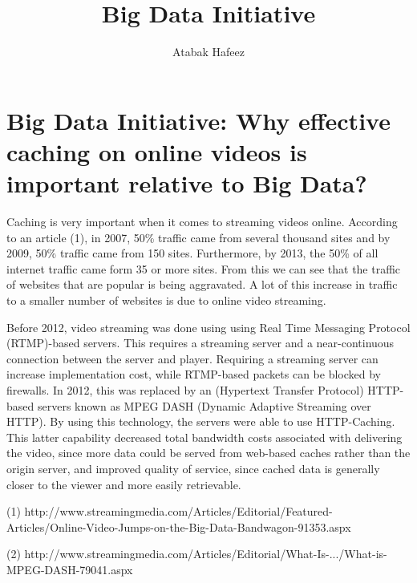 \documentclass[11pt, oneside]{article}   	%
\title{Big Data Initiative}
\author{Atabak Hafeez}
\begin{document}
\maketitle
\section{Big Data Initiative: Why effective caching on online videos is important relative to Big Data?}

Caching is very important when it comes to streaming videos online. According to an article (1), in 2007, 50\% traffic came from several thousand sites and by 2009, 50\% traffic came from 150 sites. Furthermore, by 2013, the 50\% of all internet traffic came form 35 or more sites. From this we can see that the traffic of websites that are popular is being aggravated. A lot of this increase in traffic to a smaller number of websites is due to online video streaming.

Before 2012, video streaming was done using using Real Time Messaging Protocol (RTMP)-based servers. This requires a streaming server and a near-continuous connection between the server and player. Requiring a streaming server can increase implementation cost, while RTMP-based packets can be blocked by firewalls. In 2012, this was replaced by an (Hypertext Transfer Protocol) HTTP-based servers known as MPEG DASH (Dynamic Adaptive Streaming over HTTP).  By using this technology, the servers were able to use HTTP-Caching. This latter capability decreased total bandwidth costs associated with delivering the video, since more data could be served from web-based caches rather than the origin server, and improved quality of service, since cached data is generally closer to the viewer and more easily retrievable.




(1) http://www.streamingmedia.com/Articles/Editorial/Featured-Articles/Online-Video-Jumps-on-the-Big-Data-Bandwagon-91353.aspx

(2) http://www.streamingmedia.com/Articles/Editorial/What-Is-.../What-is-MPEG-DASH-79041.aspx

\end{document}

